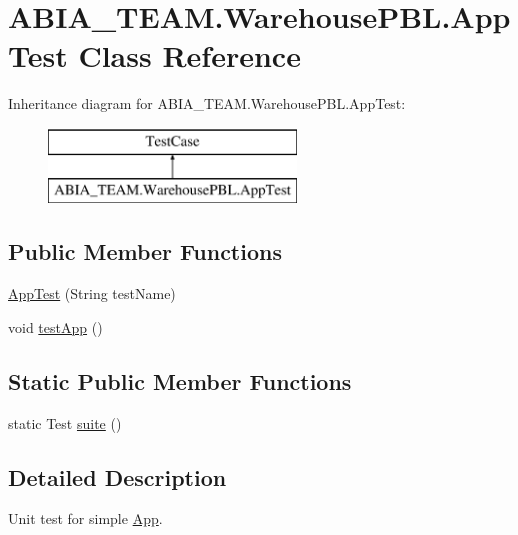 \hypertarget{class_a_b_i_a___t_e_a_m_1_1_warehouse_p_b_l_1_1_app_test}{}\section{A\+B\+I\+A\+\_\+\+T\+E\+A\+M.\+Warehouse\+P\+B\+L.\+App\+Test Class Reference}
\label{class_a_b_i_a___t_e_a_m_1_1_warehouse_p_b_l_1_1_app_test}
Inheritance diagram for A\+B\+I\+A\+\_\+\+T\+E\+A\+M.\+Warehouse\+P\+B\+L.\+App\+Test\+:\begin{figure}[H]
\begin{center}
\leavevmode
\includegraphics[height=2.000000cm]{class_a_b_i_a___t_e_a_m_1_1_warehouse_p_b_l_1_1_app_test}
\end{center}
\end{figure}
\subsection*{Public Member Functions}
\begin{DoxyCompactItemize}
\item 
\mbox{\hyperlink{class_a_b_i_a___t_e_a_m_1_1_warehouse_p_b_l_1_1_app_test_a950e4648e0c712eb08f89004c45b5097}{App\+Test}} (String test\+Name)
\item 
void \mbox{\hyperlink{class_a_b_i_a___t_e_a_m_1_1_warehouse_p_b_l_1_1_app_test_a90b5823f6dbfe81379aa8a0ee61e91d0}{test\+App}} ()
\end{DoxyCompactItemize}
\subsection*{Static Public Member Functions}
\begin{DoxyCompactItemize}
\item 
static Test \mbox{\hyperlink{class_a_b_i_a___t_e_a_m_1_1_warehouse_p_b_l_1_1_app_test_aa2b9b4e8808acbb07265881dd38df16a}{suite}} ()
\end{DoxyCompactItemize}


\subsection{Detailed Description}
Unit test for simple \mbox{\hyperlink{class_a_b_i_a___t_e_a_m_1_1_warehouse_p_b_l_1_1_app}{App}}. 

